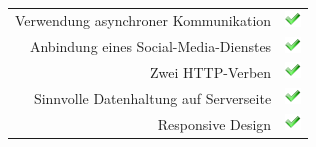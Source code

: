 \documentclass[aspectratio=43]{beamer}
\begin{document}
\begin{frame}[allowframebreaks]
\begin{longtable}{rl}
		Verwendung asynchroner Kommunikation & \includegraphics[width=12pt]{ok.png} \\
		Anbindung eines Social-Media-Dienstes & \includegraphics[width=12pt]{ok.png} \\
		Zwei HTTP-Verben & \includegraphics[width=12pt]{ok.png} \\
		Sinnvolle Datenhaltung auf Serverseite & \includegraphics[width=12pt]{ok.png} \\
		Responsive Design & \includegraphics[width=12pt]{ok.png}
		\end{longtable}
\end{frame}


\end{document}
